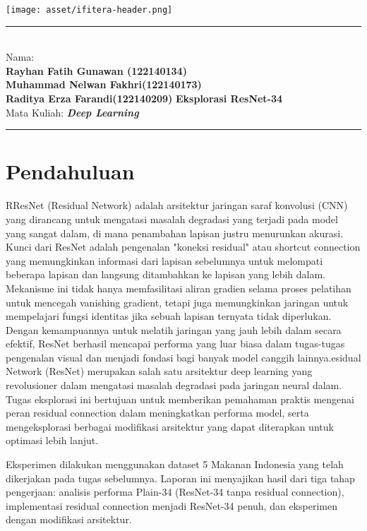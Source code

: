 \documentclass[11pt,a4paper]{article}
\newcommand{\student}{\textbf{
Rayhan Fatih Gunawan (122140134) \\
Muhammad Nelwan Fakhri(122140173) \\
Raditya Erza Farandi(122140209)
}}
\newcommand{\course}{\textbf{\textit{Deep Learning}}}
\newcommand{\assignment}{\textbf{Eksplorasi ResNet-34}}
\begin{document}
\thispagestyle{empty}
\begin{center}
	\texttt{[image: asset/ifitera-header.png]}
	\vspace{0.1cm}
\end{center}
\noindent
\rule{17cm}{0.2cm}\\[0.3cm]
Nama:
\\ \student \hfill \assignment\\[0.1cm]
Mata Kuliah: \course \hfill\\
\rule{17cm}{0.05cm}
\vspace{0.1cm}


\section{Pendahuluan}

RResNet (Residual Network) adalah arsitektur jaringan saraf konvolusi (CNN) yang dirancang untuk mengatasi masalah degradasi yang terjadi pada model yang sangat dalam, di mana penambahan lapisan justru menurunkan akurasi. Kunci dari ResNet adalah pengenalan "koneksi residual" atau shortcut connection yang memungkinkan informasi dari lapisan sebelumnya untuk melompati beberapa lapisan dan langsung ditambahkan ke lapisan yang lebih dalam. Mekanisme ini tidak hanya memfasilitasi aliran gradien selama proses pelatihan untuk mencegah vanishing gradient, tetapi juga memungkinkan jaringan untuk mempelajari fungsi identitas jika sebuah lapisan ternyata tidak diperlukan. Dengan kemampuannya untuk melatih jaringan yang jauh lebih dalam secara efektif, ResNet berhasil mencapai performa yang luar biasa dalam tugas-tugas pengenalan visual dan menjadi fondasi bagi banyak model canggih lainnya.esidual Network (ResNet) merupakan salah satu arsitektur deep learning yang revolusioner dalam mengatasi masalah degradasi pada jaringan neural dalam. Tugas eksplorasi ini bertujuan untuk memberikan pemahaman praktis mengenai peran residual connection dalam meningkatkan performa model, serta mengeksplorasi berbagai modifikasi arsitektur yang dapat diterapkan untuk optimasi lebih lanjut.

Eksperimen dilakukan menggunakan dataset 5 Makanan Indonesia yang telah dikerjakan pada tugas sebelumnya. Laporan ini menyajikan hasil dari tiga tahap pengerjaan: analisis performa Plain-34 (ResNet-34 tanpa residual connection), implementasi residual connection menjadi ResNet-34 penuh, dan eksperimen dengan modifikasi arsitektur.
\end{document}
